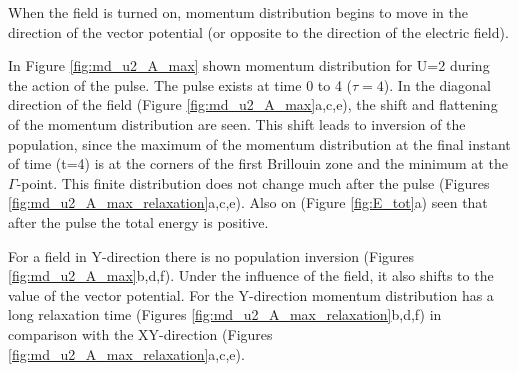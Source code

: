 When the field is turned on, momentum distribution begins to move in the direction of the vector potential (or opposite to the direction of the electric field).

In Figure \ref{fig:md_u2_A_max} shown momentum distribution for U=2 during the action of the pulse. The pulse exists at time 0 to 4 ($\tau=4$). In the diagonal direction of the field (Figure \ref{fig:md_u2_A_max}a,c,e), the shift and flattening of the momentum distribution are seen. This shift leads to inversion of the population, since the maximum of the momentum distribution at the final instant of time (t=4) is at the corners of the first Brillouin zone and the minimum at the $\Gamma$-point. This finite distribution does not change much after the pulse (Figures \ref{fig:md_u2_A_max_relaxation}a,c,e). Also on (Figure \ref{fig:E_tot}a) seen that after the pulse the total energy is positive.

For a field in Y-direction there is no population inversion (Figures \ref{fig:md_u2_A_max}b,d,f). Under the influence of the field, it also shifts to the value of the vector potential. For the Y-direction momentum distribution has a long relaxation time (Figures \ref{fig:md_u2_A_max_relaxation}b,d,f) in comparison with the XY-direction (Figures \ref{fig:md_u2_A_max_relaxation}a,c,e).

